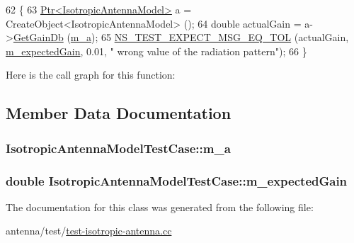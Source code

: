 \begin{DoxyCode}
62 \{
63   \hyperlink{classns3_1_1Ptr}{Ptr<IsotropicAntennaModel>} a = CreateObject<IsotropicAntennaModel> ();
64   \textcolor{keywordtype}{double} actualGain = a->\hyperlink{classns3_1_1IsotropicAntennaModel_a7321a0ede922ecccee46878d550d0d93}{GetGainDb} (\hyperlink{classIsotropicAntennaModelTestCase_aa39e72e7dabac56e7a680f80a3149c18}{m\_a});
65   \hyperlink{group__testing_ga7927b376d1fed5e576c7a3d69d26e8a0}{NS\_TEST\_EXPECT\_MSG\_EQ\_TOL} (actualGain, \hyperlink{classIsotropicAntennaModelTestCase_a285c0b7b25b1d1ed94298d46e4a3376b}{m\_expectedGain}, 0.01, \textcolor{stringliteral}{"
      wrong value of the radiation pattern"});
66 \}
\end{DoxyCode}


Here is the call graph for this function\+:




\subsection{Member Data Documentation}
\subsubsection[{\texorpdfstring{m\+\_\+a}{m_a}}]{ Isotropic\+Antenna\+Model\+Test\+Case\+::m\+\_\+a\hspace{0.3cm}{\ttfamily [private]}}\hypertarget{classIsotropicAntennaModelTestCase_aa39e72e7dabac56e7a680f80a3149c18}{}\label{classIsotropicAntennaModelTestCase_aa39e72e7dabac56e7a680f80a3149c18}
\subsubsection[{\texorpdfstring{m\+\_\+expected\+Gain}{m_expectedGain}}]{\setlength{\rightskip}{0pt plus 5cm}double Isotropic\+Antenna\+Model\+Test\+Case\+::m\+\_\+expected\+Gain\hspace{0.3cm}{\ttfamily [private]}}\hypertarget{classIsotropicAntennaModelTestCase_a285c0b7b25b1d1ed94298d46e4a3376b}{}\label{classIsotropicAntennaModelTestCase_a285c0b7b25b1d1ed94298d46e4a3376b}


The documentation for this class was generated from the following file\+:\begin{DoxyCompactItemize}
\item 
antenna/test/\hyperlink{test-isotropic-antenna_8cc}{test-\/isotropic-\/antenna.\+cc}\end{DoxyCompactItemize}
